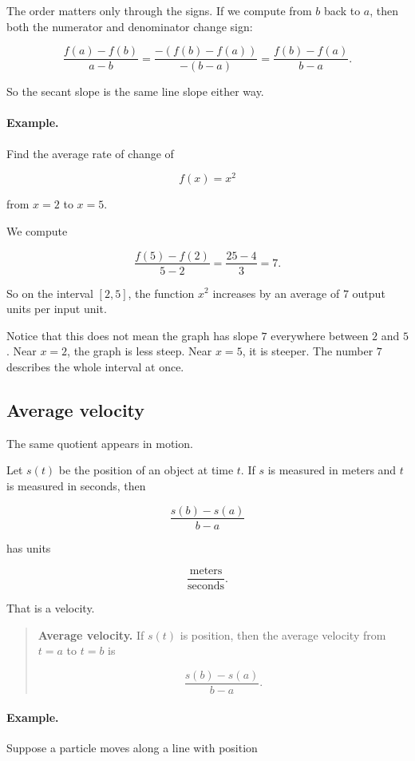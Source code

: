 The order matters only through the signs.  If we compute from \(b\) back to \(a\), then both the numerator and denominator change sign:

\[
\frac{f(a)-f(b)}{a-b}
=
\frac{-(f(b)-f(a))}{-(b-a)}
=
\frac{f(b)-f(a)}{b-a}.
\]

So the secant slope is the same line slope either way.

\paragraph{Example.}
Find the average rate of change of

\[
f(x)=x^2
\]

from \(x=2\) to \(x=5\).

We compute

\[
\frac{f(5)-f(2)}{5-2}
=
\frac{25-4}{3}
=
7.
\]

So on the interval \([2,5]\), the function \(x^2\) increases by an average of \(7\) output units per input unit.

Notice that this does not mean the graph has slope \(7\) everywhere between \(2\) and \(5\).  Near \(x=2\), the graph is less steep.  Near \(x=5\), it is steeper.  The number \(7\) describes the whole interval at once.

\subsection{Average velocity}
\label{subsec:average-velocity}

The same quotient appears in motion.

Let \(s(t)\) be the position of an object at time \(t\).  If \(s\) is measured in meters and \(t\) is measured in seconds, then

\[
\frac{s(b)-s(a)}{b-a}
\]

has units

\[
\frac{\text{meters}}{\text{seconds}}.
\]

That is a velocity.

\begin{quote}
\textbf{Average velocity.}
If \(s(t)\) is position, then the average velocity from \(t=a\) to \(t=b\) is

\[
\boxed{
\frac{s(b)-s(a)}{b-a}.
}
\]
\end{quote}

\paragraph{Example.}
Suppose a particle moves along a line with position

